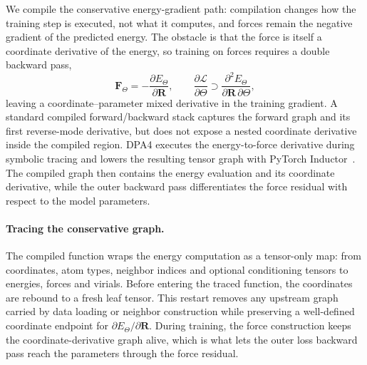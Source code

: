 We compile the conservative energy-gradient path: compilation changes how the training step is executed, not what it computes, and forces remain the negative gradient of the predicted energy.
The obstacle is that the force is itself a coordinate derivative of the energy, so training on forces requires a double backward pass,
\begin{equation}
    \mathbf{F}_{\Theta}
    = -\frac{\partial E_{\Theta}}{\partial \mathbf{R}},
    \qquad
    \frac{\partial\mathcal{L}}{\partial\Theta}
    \supset
    \frac{\partial^2E_{\Theta}}{\partial\mathbf{R}\,\partial\Theta},
    \label{eq:dpa4-double-backward}
\end{equation}
leaving a coordinate--parameter mixed derivative in the training gradient.
A standard compiled forward/backward stack captures the forward graph and its first reverse-mode derivative, but does not expose a nested coordinate derivative inside the compiled region.
DPA4 executes the energy-to-force derivative during symbolic tracing and lowers the resulting tensor graph with PyTorch Inductor~\cite{ansel2024pytorch2}.
The compiled graph then contains the energy evaluation and its coordinate derivative, while the outer backward pass differentiates the force residual with respect to the model parameters.

\paragraph{Tracing the conservative graph.}
The compiled function wraps the energy computation as a tensor-only map: from coordinates, atom types, neighbor indices and optional conditioning tensors to energies, forces and virials.
Before entering the traced function, the coordinates are rebound to a fresh leaf tensor.
This restart removes any upstream graph carried by data loading or neighbor construction while preserving a well-defined coordinate endpoint for $\partial E_{\Theta}/\partial\mathbf{R}$.
During training, the force construction keeps the coordinate-derivative graph alive, which is what lets the outer loss backward pass reach the parameters through the force residual.


